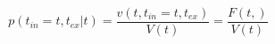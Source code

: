 \begin{equation}
p(t_{in}=t,t_{ex}|t)  = \frac{v(t,t_{in}=t,t_{ex})}{V(t)}= \frac{F(t,)}{V(t)}
\end{equation}\begin{equation}

\end{equation}
